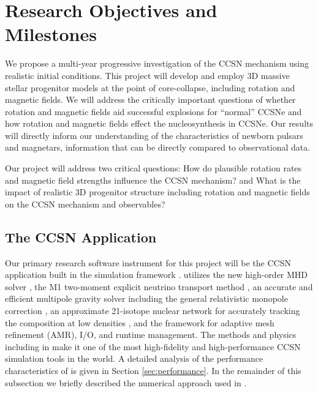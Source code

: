 \section{Research Objectives and Milestones}
\label{sec:objectives}

We propose a multi-year progressive investigation of the CCSN mechanism using realistic initial conditions.
This project will develop and employ 3D massive stellar progenitor models at the point of core-collapse, including rotation and magnetic fields.
We will address the critically important questions of whether rotation and magnetic fields aid successful explosions for ``normal'' CCSNe and how rotation and magnetic fields effect the nucleosynthesis in CCSNe.
Our results will directly inform our understanding of the characteristics of newborn pulsars and magnetars, information that can be directly compared to observational data.

Our project will address two critical questions: How do plausible rotation rates and magnetic field strengths influence the CCSN mechanism? and What is the impact of realistic 3D progenitor structure including rotation and magnetic fields on the CCSN mechanism and observables?

\subsection{The \sparkmone CCSN Application}
\label{sec:spark}

Our primary research software instrument for this project will be the \sparkmone CCSN application built in the \flash simulation framework \citep{Fryxell:2000, Dubey:2009}.
\sparkmone utilizes the new \spark high-order MHD solver \citep{Couch:2017}, the M1 two-moment explicit neutrino transport method \citep{Shibata:2011a, OConnor:2015, OConnor:2015a}, an accurate and efficient multipole gravity solver \citep{Couch:2013c} including the general relativistic monopole correction \citep{Marek:2006}, an approximate 21-isotope nuclear network for accurately tracking the composition at low densities \citep{Couch:2015a}, and the \flash framework for adaptive mesh refinement (AMR), I/O, and runtime management.
The methods and physics including in \sparkmone make it one of the most high-fidelity and high-performance CCSN simulation tools in the world.
A detailed analysis of the performance characteristics of \sparkmone is given in Section \ref{sec:performance}.
In the remainder of this subsection we briefly described the numerical approach used in \sparkmone.

